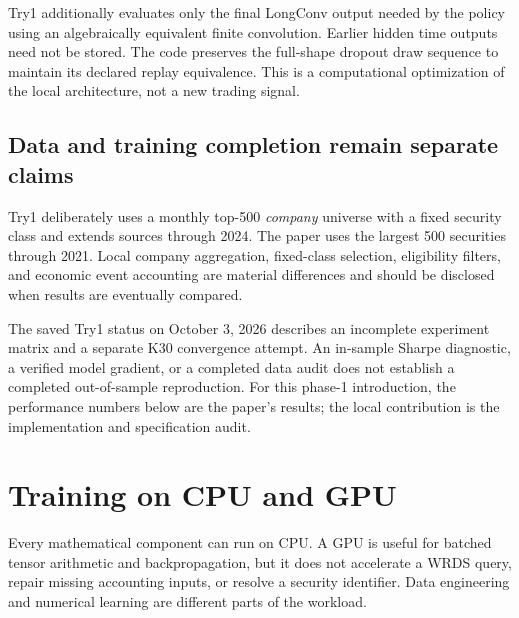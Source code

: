 \documentclass[11pt]{article}
\begin{document}
Try1 additionally evaluates only the final LongConv output needed by
the policy using an algebraically equivalent finite convolution.
Earlier hidden time outputs need not be stored. The code preserves
the full-shape dropout draw sequence to maintain its declared replay
equivalence. This is a computational optimization of the local
architecture, not a new trading signal.

\subsection{Data and training completion remain separate claims}

Try1 deliberately uses a monthly top-500 \emph{company} universe with
a fixed security class and extends sources through 2024. The paper
uses the largest 500 securities through 2021. Local company
aggregation, fixed-class selection, eligibility filters, and economic
event accounting are material differences and should be disclosed
when results are eventually compared.

The saved Try1 status on October 3, 2026 describes an incomplete
experiment matrix and a separate K30 convergence attempt. An
in-sample Sharpe diagnostic, a verified model gradient, or a completed
data audit does not establish a completed out-of-sample reproduction.
For this phase-1 introduction, the performance numbers below are
the paper's results; the local contribution is the implementation
and specification audit.

\section{Training on CPU and GPU}
\label{sec:cpu-gpu}

Every mathematical component can run on CPU. A GPU is useful for
batched tensor arithmetic and backpropagation, but it does not
accelerate a WRDS query, repair missing accounting inputs, or resolve
a security identifier. Data engineering and numerical learning are
different parts of the workload.
\end{document}
